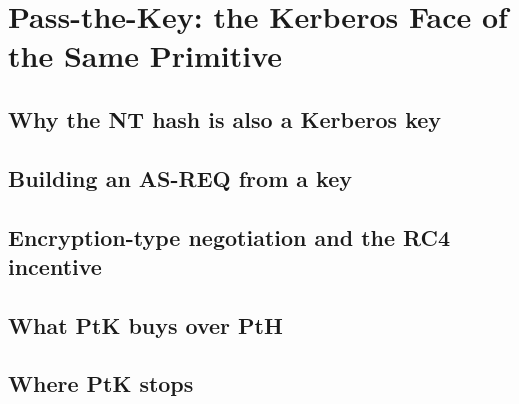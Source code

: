 \section{Pass-the-Key: the Kerberos Face of the Same Primitive}
\unwritten
\label{sec:ptk}

\subsection{Why the NT hash is also a Kerberos key}
\unwritten

\subsection{Building an AS-REQ from a key}
\unwritten

\subsection{Encryption-type negotiation and the RC4 incentive}
\unwritten

\subsection{What PtK buys over PtH}
\unwritten

\subsection{Where PtK stops}
\unwritten
